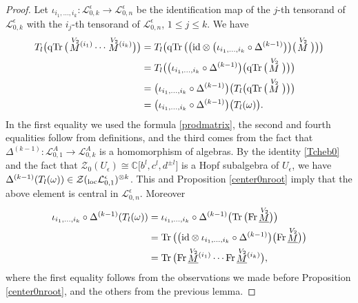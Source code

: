 \documentclass[pdftex]{sigma}%
\numberwithin{equation}{section}
\numberwithin{figure}{section}
\newcommand{\e}{\epsilon}
\newcommand{\mc}{\mathbb{C}}
\newcommand{\Ll}{{\mathcal L}}
\newcommand{\ra}{\rightarrow}
\begin{document}
\begin{proof}
Let $\iota_{i_1,\dots,i_k}\colon \Ll_{0,k}^\e \ra \Ll_{0,n}^\e$ be the identification map of the $j$-th tensorand of $\Ll_{0,k}^\e$ with the $i_j$-th tensorand of $\Ll_{0,n}^\e$, $1\leq j\leq k$. We have
\begin{align*}
T_l\big(\!\operatorname{qTr}\big(\!\stackrel{V_2}{M}{}^{\!\! (i_1)}\cdots \stackrel{V_2}{M}{}^{\!\! (i_k)}\big)\big) &= T_l\big(\!\operatorname{qTr}\big(\big({\rm id}\otimes \big(\iota_{i_1,\dots,i_k}\circ \Delta^{(k-1)}\big)\big)\big(\!\stackrel{V_2}{M}\big)\big)\big)
\\
& = T_l\big(\big(\iota_{i_1,\dots,i_k}\circ \Delta^{(k-1)}\big)\big(\!\operatorname{qTr}\big(\!\stackrel{V_2}{M}\big)\big)\big)
 \\
& = \big(\iota_{i_1,\dots,i_k}\circ \Delta^{(k-1)}\big)\big(T_l\big(\!\operatorname{qTr}\big(\!\stackrel{V_2}{M}\big)\big)\big)
 \\
& = \big(\iota_{i_1,\dots,i_k}\circ \Delta^{(k-1)}\big)\big(T_l(\omega)\big).
\end{align*}
In the first equality we used the formula \eqref{prodmatrix}, the second and fourth equalities follow from definitions, and the third comes from the fact that $\Delta^{(k-1)}\colon \Ll_{0,1}^A\rightarrow \Ll_{0,k}^A$ is a homomorphism of algebras. By the identity \eqref{Tcheb0} and the fact that $\mathcal{Z}_0(U_\epsilon) \cong \mc\big[b^l,c^l,d^{\pm l}\big]$ is a Hopf subalgebra of $U_\e$, we have $\Delta^{(k-1)}(T_l(\omega)) \in \mathcal{Z}({}_{\rm loc}\Ll_{0,1}^\e)^{\otimes k}$. This and Proposition \ref{center0nroot} imply that the above element is central in $\Ll_{0,n}^\e$. Moreover
\vspace{-1ex}
\begin{align*}
\iota_{i_1,\dots,i_k}\circ \Delta^{(k-1)}(T_l(\omega)) & = \iota_{i_1,\dots,i_k}\circ \Delta^{(k-1)}\big(\!\operatorname{Tr}\big(\!\operatorname{Fr}\underline{\stackrel{V_2}{M}}\big)\big)
\\
& = \operatorname{Tr}\big(\big({\rm id}\otimes \iota_{i_1,\dots,i_k}\circ \Delta^{(k-1)}\big)\big(\!\operatorname{Fr}\underline{\stackrel{V_2}{M}}\big)\big)
\\
& = \operatorname{Tr}\big(\!\operatorname{Fr}\underline{\stackrel{V_2}{M}}{}^{(i_1)}\cdots \operatorname{Fr}\underline{\stackrel{V_2}{M}}{}^{(i_k)}\big),
\end{align*}
where the first equality follows from the observations we made before Proposition \ref{center0nroot}, and the others from the previous lemma.
\end{proof}
\end{document}
